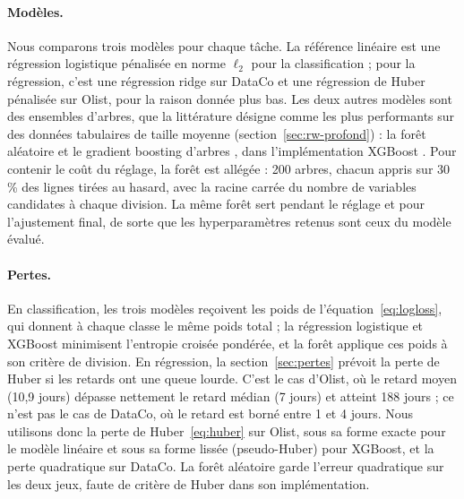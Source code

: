 \documentclass[11pt,a4paper]{article}
\theoremstyle{definition}
\begin{document}
\paragraph{Modèles.} Nous comparons trois modèles pour chaque tâche. La référence linéaire est une régression logistique pénalisée en norme $\ell_2$ pour la classification ; pour la régression, c'est une régression ridge sur DataCo et une régression de Huber pénalisée sur Olist, pour la raison donnée plus bas. Les deux autres modèles sont des ensembles d'arbres, que la littérature désigne comme les plus performants sur des données tabulaires de taille moyenne (section~\ref{sec:rw-profond}) : la forêt aléatoire \cite{breiman2001random} et le gradient boosting d'arbres \cite{friedman2001greedy}, dans l'implémentation XGBoost \cite{chen2016xgboost}. Pour contenir le coût du réglage, la forêt est allégée : 200 arbres, chacun appris sur 30\,\% des lignes tirées au hasard, avec la racine carrée du nombre de variables candidates à chaque division. La même forêt sert pendant le réglage et pour l'ajustement final, de sorte que les hyperparamètres retenus sont ceux du modèle évalué.

\paragraph{Pertes.} En classification, les trois modèles reçoivent les poids de l'équation~\eqref{eq:logloss}, qui donnent à chaque classe le même poids total ; la régression logistique et XGBoost minimisent l'entropie croisée pondérée, et la forêt applique ces poids à son critère de division. En régression, la section~\ref{sec:pertes} prévoit la perte de Huber si les retards ont une queue lourde. C'est le cas d'Olist, où le retard moyen (10,9 jours) dépasse nettement le retard médian (7 jours) et atteint 188 jours ; ce n'est pas le cas de DataCo, où le retard est borné entre 1 et 4 jours. Nous utilisons donc la perte de Huber~\eqref{eq:huber} sur Olist, sous sa forme exacte pour le modèle linéaire et sous sa forme lissée (pseudo-Huber) pour XGBoost, et la perte quadratique sur DataCo. La forêt aléatoire garde l'erreur quadratique sur les deux jeux, faute de critère de Huber dans son implémentation.
\end{document}
